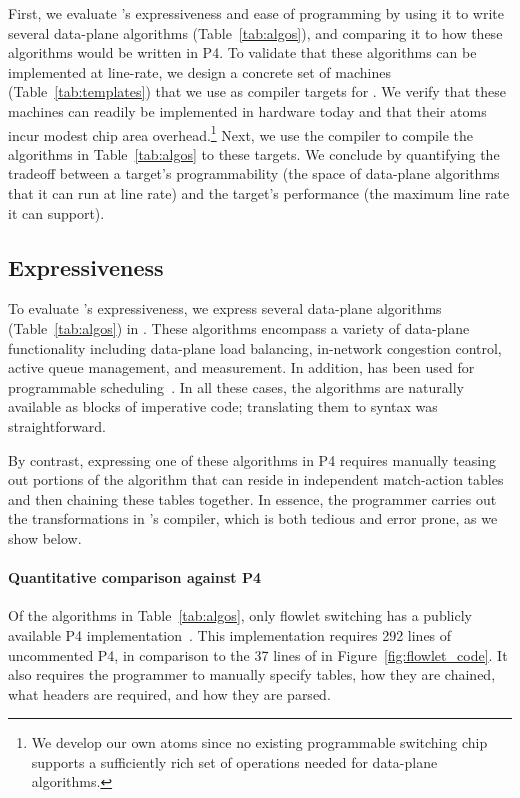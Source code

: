First, we evaluate \pktlanguage's expressiveness and ease of
programming by using it to write several data-plane algorithms
(Table~\ref{tab:algos}), and comparing it to how these algorithms
would be written in P4.  To validate that these algorithms can be
implemented at line-rate, we design a concrete set of \absmachine
machines (Table~\ref{tab:templates}) that we use as compiler targets
for \pktlanguage.  We verify that these machines can readily be
implemented in hardware today and that their atoms incur modest chip
area overhead.\footnote{We develop our own atoms since no existing
  programmable switching chip supports a sufficiently rich set of
  operations needed for data-plane algorithms.} Next, we use the
\pktlanguage compiler to compile the algorithms in
Table~\ref{tab:algos} to these targets.  We conclude by quantifying
the tradeoff between a target's programmability (the space of
data-plane algorithms that it can run at line rate) and the target's
performance (the maximum line rate it can support).

\subsection{Expressiveness}
\label{ss:Expressiveness}

To evaluate \pktlanguage's expressiveness, we express several
data-plane algorithms (Table~\ref{tab:algos}) in \pktlanguage. These
algorithms encompass a variety of data-plane functionality including
data-plane load balancing, in-network congestion control, active queue
management, and measurement. In addition, \pktlanguage has been used
for programmable scheduling~\cite{prog_sched_arxiv}. In all these cases, the algorithms are
naturally available as blocks of imperative code; translating them to
\pktlanguage syntax was straightforward.

By contrast, expressing one of these algorithms in P4 requires
manually teasing out portions of the algorithm that can reside in
independent match-action tables and then chaining these tables
together. In essence, the programmer carries out the transformations
in \pktlanguage's compiler, which is both tedious and error prone, as
we show below.

\paragraph{Quantitative comparison against P4} Of the algorithms in
Table~\ref{tab:algos}, only flowlet switching has a publicly available
P4 implementation~\cite{p4_flowlet}. This implementation requires 292
lines of uncommented P4, in comparison to the 37 lines of \pktlanguage
in Figure~\ref{fig:flowlet_code}. It also requires the programmer to
manually specify tables, how they are chained, what headers are
required, and how they are parsed.

